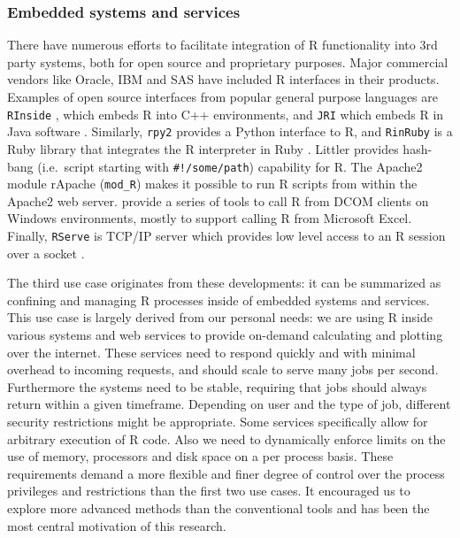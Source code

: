 \documentclass{jss}
\newcommand{\R}{\textsf{R}\xspace}
\newcommand{\Java}{\textsf{Java}\xspace}
\newcommand{\Cpp}{\textsf{C++}\xspace}
\newcommand{\Python}{\textsf{Python}\xspace}
\newcommand{\Ruby}{\textsf{Ruby}\xspace}
\begin{document}
\subsubsection{Embedded systems and services}

There have numerous efforts to facilitate integration of \R functionality into
3rd party systems, both for open source and proprietary purposes. Major
commercial vendors like Oracle, IBM and SAS have included \R interfaces in their
products. Examples of open source interfaces from popular general purpose
languages are \texttt{RInside} \citep{RInside}, which embeds \R into \Cpp
environments, and \texttt{JRI} which embeds \R in \Java software
\citep{JRI,urbanek2007rjava}. Similarly, \texttt{rpy2}
\citep{moreira2006rpy,gautier2008rpy2} provides a \Python interface to \R, and
\texttt{RinRuby} is a \Ruby library that integrates the \R interpreter in Ruby
\citep{dahl2008rinruby}. Littler provides hash-bang (i.e.\ script starting with
\texttt{\#!/some/path}) capability for \R \citep{littler}. The Apache2 module
rApache (\texttt{mod\_R}) \citep{rapache} makes it possible to run \R scripts
from within the Apache2 web server. \cite{heiberger2009r} provide a series of
tools to call \R from DCOM clients on Windows environments, mostly to support
calling \R from Microsoft Excel. Finally, \texttt{RServe} is TCP/IP server which
provides low level access to an \R session over a socket \citep{Rserve}.

The third use case originates from these developments: it can be summarized as
confining and managing \R processes inside of embedded systems and services.
This use case is largely derived from our personal needs: we are using \R inside
various systems and web services to provide on-demand calculating and plotting
over the internet. These services need to respond quickly and with minimal
overhead to incoming requests, and should scale to serve many jobs per second.
Furthermore the systems need to be stable, requiring that jobs should always
return within a given timeframe. Depending on user and the type of job,
different security restrictions might be appropriate. Some services specifically
allow for arbitrary execution of \R code. Also we need to dynamically enforce
limits on the use of memory, processors and disk space on a per process basis.
These requirements demand a more flexible and finer degree of control over the
process privileges and restrictions than the first two use cases. It encouraged
us to explore more advanced methods than the conventional tools and has been
the most central motivation of this research.
\end{document}
